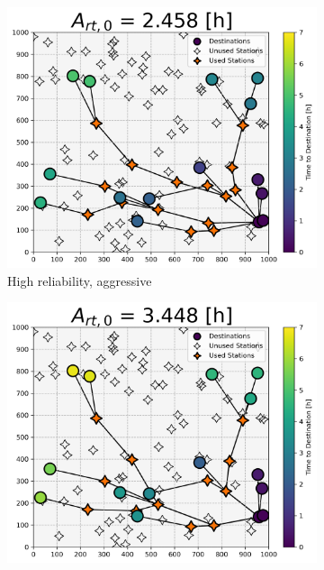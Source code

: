 \documentclass[11pt]{article}
\begin{document}
\begin{multicols}{2}
\begin{figure}[H]
	\centering
	\begin{subfigure}[t]{.5\linewidth}
		\centering\captionsetup{width = .8\linewidth}
		\includegraphics[width = \linewidth]{figs/random_example_high_reliability_aggressive.png}
		\caption{High reliability, aggressive}
	\end{subfigure}%
	\begin{subfigure}[t]{.5\linewidth}
		\centering\captionsetup{width = .8\linewidth}
		\includegraphics[width = \linewidth]{figs/random_example_high_reliability_cautious.png}

\end{subfigure}
\end{figure}
\end{multicols}
\end{document}
